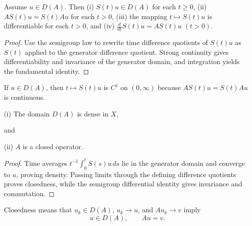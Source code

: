 \begin{theorem}
\label{thm:semigroup-differential-properties}
Assume $u \in D(A)$. Then
(i) $S(t)u \in D(A)$ for each $t \geq 0$,
(ii) $AS(t)u = S(t)Au$ for each $t > 0$,
(iii) the mapping $t \mapsto S(t)u$ is differentiable for each $t > 0$,
and
(iv) $\frac{d}{dt}S(t)u = AS(t)u$ \quad $(t > 0)$.
\end{theorem}

\begin{proof}
\sketch Use the semigroup law to rewrite time difference quotients of $S(t)u$ as $S(t)$ applied to the generator difference quotient. Strong continuity gives differentiability and invariance of the generator domain, and integration yields the fundamental identity.
\end{proof}

\begin{remark}
\label{rem:semigroup-c1-remark}
If $u\in D(A)$, then $t\mapsto S(t)u$ is $C^1$ on $(0,\infty)$ because $AS(t)u=S(t)Au$ is continuous.
\end{remark}

\begin{theorem}
\label{thm:semigroup-generator-properties}
(i) The domain $D(A)$ is dense in $X$,

and

(ii) $A$ is a closed operator.
\end{theorem}

\begin{proof}
\sketch Time averages $t^{-1}\int_0^tS(s)u\,ds$ lie in the generator domain and converge to $u$, proving density. Passing limits through the defining difference quotients proves closedness, while the semigroup differential identity gives invariance and commutation.
\end{proof}

\begin{remark}
\label{rem:closed-operator-definition}
Closedness means that $u_k\in D(A)$, $u_k\to u$, and $Au_k\to v$ imply
\[
u\in D(A),\qquad Au=v.
\]
\end{remark}

